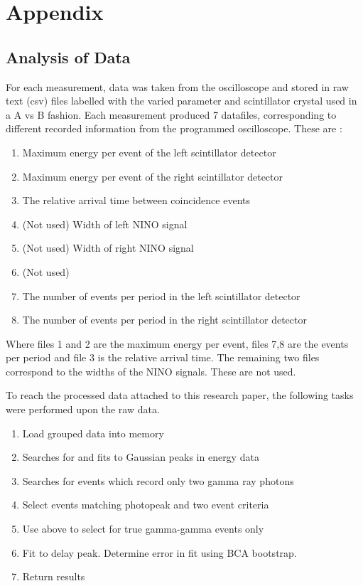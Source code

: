 \section*{Appendix}
\subsection{Analysis of Data}
For each measurement, data was taken from the oscilloscope and stored in raw text (csv) files labelled with the varied parameter and scintillator crystal used in a A vs B fashion. Each measurement produced 7 datafiles, corresponding to different recorded information from the programmed oscilloscope. These are :
\begin{enumerate}
\item Maximum energy per event of the left scintillator detector
\item Maximum energy per event of the right scintillator detector
\item The relative arrival time between coincidence events
\item (Not used) Width of left NINO signal
\item (Not used) Width of right NINO signal
\item (Not used)
\item The number of events per period in the left scintillator detector
\item The number of events per period in the right scintillator detector
\end{enumerate}
Where files 1 and 2 are the maximum energy per event, files 7,8 are the events per period and file 3 is the relative arrival time. The remaining two files correspond to the widths of the NINO signals. These are not used.

To reach the processed data attached to this research paper, the following tasks were performed upon the raw data.

\begin{enumerate}
\item Load grouped data into memory
\item Searches for and fits to Gaussian peaks in energy data
\item Searches for events which record only two gamma ray photons
\item Select events matching photopeak and two event criteria
\item Use above to select for true gamma-gamma events only
\item Fit to delay peak. Determine error in fit using BCA bootstrap.
\item Return results
\end{enumerate}

